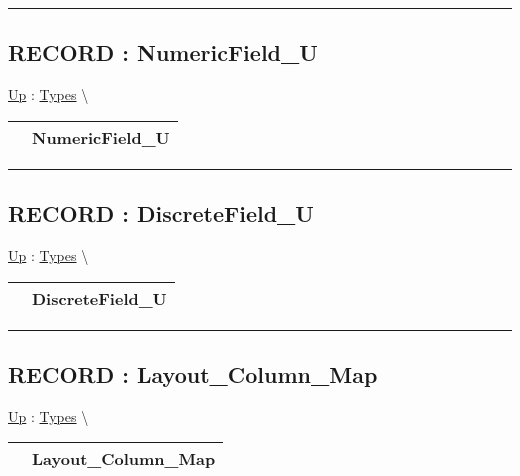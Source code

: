 \par


\rule{\linewidth}{0.5pt}
\subsection*{RECORD : NumericField\_U}
\hypertarget{ecldoc:logisticregression.types.numericfield_u}{}
\hyperlink{ecldoc:LogisticRegression.Types}{Up} :
\hspace{0pt} \hyperlink{ecldoc:LogisticRegression.Types}{Types} \textbackslash 

{\renewcommand{\arraystretch}{1.5}
\begin{tabularx}{\textwidth}{|>{\raggedright\arraybackslash}l|X|}
\hline
\hspace{0pt} & NumericField\_U \\
\hline
\end{tabularx}
}

\par


\rule{\linewidth}{0.5pt}
\subsection*{RECORD : DiscreteField\_U}
\hypertarget{ecldoc:logisticregression.types.discretefield_u}{}
\hyperlink{ecldoc:LogisticRegression.Types}{Up} :
\hspace{0pt} \hyperlink{ecldoc:LogisticRegression.Types}{Types} \textbackslash 

{\renewcommand{\arraystretch}{1.5}
\begin{tabularx}{\textwidth}{|>{\raggedright\arraybackslash}l|X|}
\hline
\hspace{0pt} & DiscreteField\_U \\
\hline
\end{tabularx}
}

\par


\rule{\linewidth}{0.5pt}
\subsection*{RECORD : Layout\_Column\_Map}
\hypertarget{ecldoc:logisticregression.types.layout_column_map}{}
\hyperlink{ecldoc:LogisticRegression.Types}{Up} :
\hspace{0pt} \hyperlink{ecldoc:LogisticRegression.Types}{Types} \textbackslash 

{\renewcommand{\arraystretch}{1.5}
\begin{tabularx}{\textwidth}{|>{\raggedright\arraybackslash}l|X|}
\hline
\hspace{0pt} & Layout\_Column\_Map \\
\hline
\end{tabularx}
}

